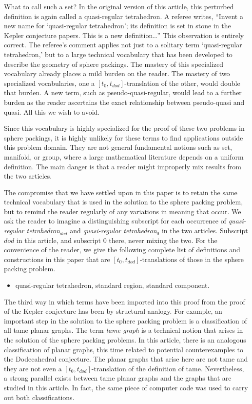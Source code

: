 What to call such a set?  In the original version of this article,
this perturbed definition is again called a quasi-regular tetrahedron. 
A referee writes, ``Invent a new name
for `quasi-regular tetrahedron'; its definition is set in stone
in the Kepler conjecture papers.  This is a new definition\ldots'' 
This observation is entirely correct.  The referee's comment applies not
just to a solitary term `quasi-regular tetrahedron,' but to
a large technical vocabulary that has been developed to describe
the geometry of sphere packings.  The mastery of this specialized
vocabulary already places a mild burden on the reader.  The mastery
of two specialized vocabularies, one a $[t_0,t_{dod}]$-translation
of the other, would double that burden.  A new term,
such as pseudo-quasi-regular, would lead to a further burden
as the reader ascertains the exact relationship between
pseudo-quasi and quasi.  All this we wish to avoid.

Since this vocabulary is highly specialized for the proof of these
two problems in sphere packings, it is highly unlikely for these terms to find applications outside this problem domain.  They are not 
general fundamental notions such as set, manifold, or group, where
a large mathematical literature depends on a uniform definition.
The main danger is that a reader might improperly mix results from the
two articles.


The compromise that we have settled upon in this paper is to
retain the same technical vocabulary that is used in the solution
to the sphere packing problem, but to remind the reader regularly
of any variations in meaning that occur.  We ask the reader to
imagine a distinguishing subscript for each occurrence of {\it quasi-regular tetrahedron$_{dod}$}
and 
{\it quasi-regular tetrahedron$_0$} in the two articles.  
Subscript $dod$ in this article, 
and subscript $0$
there, never mixing the two.
For the convenience
of the reader, we give the following complete 
list of definitions and constructions in this
paper that are $[t_0,t_{dod}]$-translations of those in the sphere
packing problem.

\begin{itemize}
\item quasi-regular tetrahedron, standard region, standard component.
\end{itemize}

The third way in which terms have been imported into this proof
from the proof of the Kepler conjecture has been by structural
analogy.  For example, an important step in the solution to the
sphere packing problem is a classification of all tame planar graphs.
The term {\it tame graph} is a technical notion that arises in
the solution of the sphere packing problems.  In this article,
there is an analogous classification of planar graphs, this time
related to potential counterexamples to the Dodecahedral conjecture.
The planar graphs that arise here are not tame and they are
not even a $[t_0,t_{dod}]$-translation of the definition of tame.  
Nevertheless, a strong parallel exists between tame planar graphs 
and the graphs that are studied in this article.  
In fact, the same piece of computer
code was used to carry out both classifications. 

